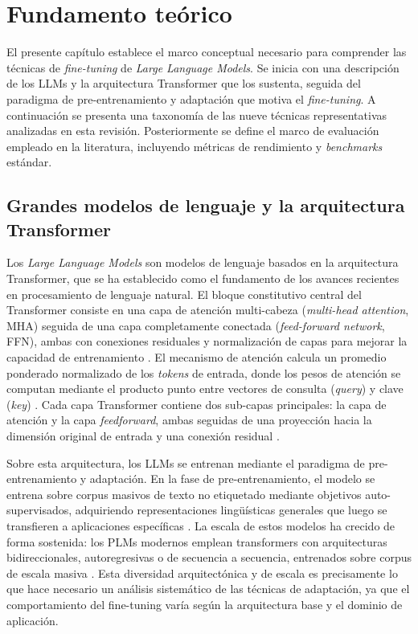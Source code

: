 \chapter{Fundamento teórico}

El presente capítulo establece el marco conceptual necesario para comprender las técnicas de \textit{fine-tuning} de \textit{Large Language Models}. Se inicia con una descripción de los LLMs y la arquitectura Transformer que los sustenta, seguida del paradigma de pre-entrenamiento y adaptación que motiva el \textit{fine-tuning}. A continuación se presenta una taxonomía de las nueve técnicas representativas analizadas en esta revisión. Posteriormente se define el marco de evaluación empleado en la literatura, incluyendo métricas de rendimiento y \textit{benchmarks} estándar.

\section{Grandes modelos de lenguaje y la arquitectura Transformer}

Los \textit{Large Language Models} son modelos de lenguaje basados en la arquitectura Transformer, que se ha establecido como el fundamento de los avances recientes en procesamiento de lenguaje natural. El bloque constitutivo central del Transformer consiste en una capa de atención multi-cabeza (\textit{multi-head attention}, MHA) seguida de una capa completamente conectada (\textit{feed-forward network}, FFN), ambas con conexiones residuales y normalización de capas para mejorar la capacidad de entrenamiento \parencite[p.~3]{Lialin2024}. El mecanismo de atención calcula un promedio ponderado normalizado de los \textit{tokens} de entrada, donde los pesos de atención se computan mediante el producto punto entre vectores de consulta (\textit{query}) y clave (\textit{key}) \parencite[p.~3]{Lialin2024}. Cada capa Transformer contiene dos sub-capas principales: la capa de atención y la capa \textit{feedforward}, ambas seguidas de una proyección hacia la dimensión original de entrada y una conexión residual \parencite[p.~3]{houlsby2019parameterefficienttransferlearningnlp}.

Sobre esta arquitectura, los LLMs se entrenan mediante el paradigma de pre-entrenamiento y adaptación. En la fase de pre-entrenamiento, el modelo se entrena sobre corpus masivos de texto no etiquetado mediante objetivos auto-supervisados, adquiriendo representaciones lingüísticas generales que luego se transfieren a aplicaciones específicas \parencite[p.~220]{Ding2023}. La escala de estos modelos ha crecido de forma sostenida: los PLMs modernos emplean transformers con arquitecturas bidireccionales, autoregresivas o de secuencia a secuencia, entrenados sobre corpus de escala masiva \parencite[p.~220]{Ding2023}. Esta diversidad arquitectónica y de escala es precisamente lo que hace necesario un análisis sistemático de las técnicas de adaptación, ya que el comportamiento del fine-tuning varía según la arquitectura base y el dominio de aplicación.

